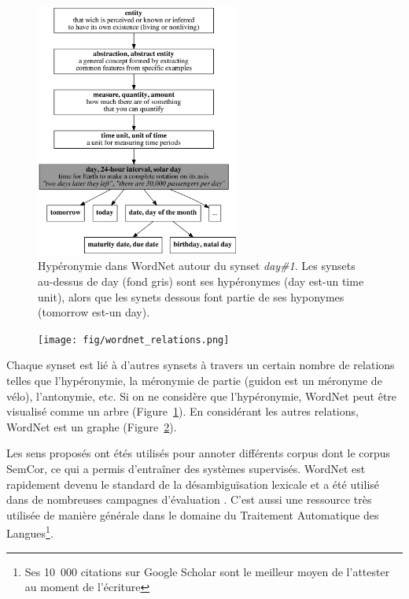 \begin{figure}[ht]
    \centering
    \includegraphics[width=0.6\textwidth]{fig/wordnet_hypernymy.png}
    \caption{\label{fig:wordnet_hypernymy}Hypéronymie dans WordNet autour du
synset \emph{day\#1}. Les synsets au-dessus de day (fond gris) sont ses
hypéronymes (day est-un time unit), alors que les synets dessous font partie de
ses hyponymes (tomorrow est-un day).}
\end{figure}

\begin{figure}[ht]
    \centering
    \texttt{[image: fig/wordnet\_relations.png]}
    \caption{\label{fig:wordnet_relations}}
\end{figure}

Chaque synset est lié à d'autres synsets à travers un certain nombre de
relations telles que l'hypéronymie, la méronymie de partie (guidon est un
méronyme de vélo), l'antonymie, etc. Si on ne considère que l'hypéronymie,
WordNet peut être visualisé comme un arbre
(Figure~\ref{fig:wordnet_hypernymy}). En considérant les autres relations,
WordNet est un graphe (Figure~\ref{fig:wordnet_relations}).

Les sens proposés ont étés utilisés pour annoter différents corpus dont le
corpus SemCor, ce qui a permis d'entraîner des systèmes supervisés. WordNet est
rapidement devenu le standard de la désambiguïsation lexicale et a été utilisé
dans de nombreuses campagnes d'évaluation \citep{navigli2009word}. C'est aussi
une ressource très utilisée de manière générale dans le domaine du Traitement
Automatique des Langues\footnote{Ses 10~000 citations sur Google Scholar sont
le meilleur moyen de l'attester au moment de l'écriture}.


